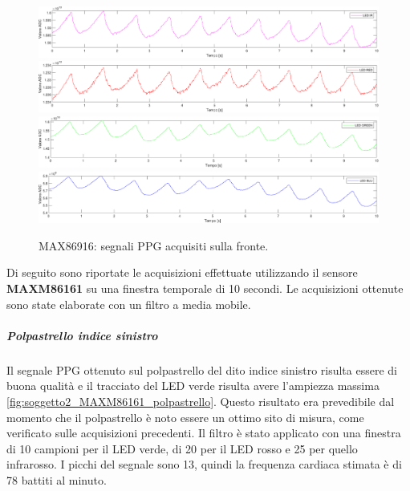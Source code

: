 \begin{figure}[h]
	\centering
	\includegraphics[width=1\linewidth]{ImageFiles/Misure Preliminari/Soggetto 2/max86916/fronte_ired}
	\includegraphics[width=1\linewidth]{ImageFiles/Misure Preliminari/Soggetto 2/max86916/fronte_red}
	\includegraphics[width=1\linewidth]{ImageFiles/Misure Preliminari/Soggetto 2/max86916/fronte_green}
	\includegraphics[width=1\linewidth]{ImageFiles/Misure Preliminari/Soggetto 2/max86916/fronte_blu}
	\caption{MAX86916: segnali PPG acquisiti sulla fronte.}
	\label{fig:soggetto2_MAX86916_fronte}
\end{figure}

\clearpage

Di seguito sono riportate le acquisizioni effettuate utilizzando il sensore \textbf{MAXM86161} su una finestra temporale di 10 secondi. Le acquisizioni ottenute sono state elaborate con un filtro a media mobile.

\subparagraph{Polpastrello indice sinistro}
Il segnale PPG ottenuto sul polpastrello del dito indice sinistro risulta essere di buona qualità e il tracciato del LED verde risulta avere l'ampiezza massima \ref{fig:soggetto2_MAXM86161_polpastrello}. Questo risultato era prevedibile dal momento che il polpastrello è noto essere un ottimo sito di misura, come verificato sulle acquisizioni precedenti. Il filtro è stato applicato con una finestra di 10 campioni per il LED verde, di 20 per il LED rosso e 25 per quello infrarosso. I picchi del segnale sono 13, quindi la frequenza cardiaca stimata è di 78 battiti al minuto.

